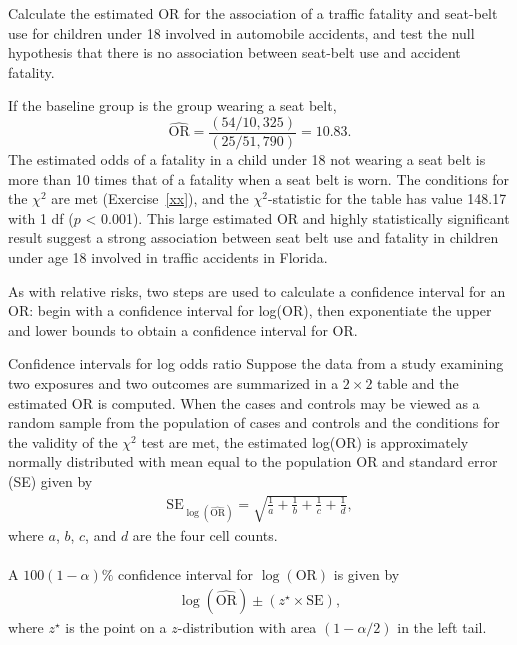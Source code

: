 
\begin{examplewrap}
  \begin{nexample}{Calculate the estimated OR for the association of a traffic fatality and seat-belt use for children under 18 involved in automobile accidents, and test the null hypothesis that there is no association between seat-belt use and accident fatality.} \label{seatbeltUseFatalityChildren}

    If the baseline group is the group wearing a seat belt,
 \[
      \widehat{\text{OR}} = \dfrac{(54/10,325)}{(25/51,790)} = 10.83.
 \]
 The estimated odds of a fatality in a child under 18 not wearing a seat belt is more than 10 times that of a fatality when a seat belt is worn.  The conditions for the $\chi^2$ are met (Exercise~\ref{xx}), and the $\chi^2$-statistic for the table has value 148.17 with 1 df ($p$ < 0.001).  This large estimated OR and highly statistically significant result suggest a strong association between seat belt use and fatality in children under age 18 involved in traffic accidents in Florida.
  \end{nexample}
\end{examplewrap}

As with relative risks, two steps are used to calculate a confidence interval for an OR: begin with a confidence interval for log(OR), then exponentiate the upper and lower bounds to obtain a confidence interval for OR.

\begin{onebox}{Confidence intervals for log odds ratio}
  Suppose the data from a study examining two exposures and two outcomes are summarized in a $2 \times 2$ table and the estimated OR is computed. When the cases and controls may be viewed as a random sample from the population of cases and controls and the conditions for the validity of the $\chi^2$ test are met, the estimated log(OR) is approximately normally distributed with mean equal to the population OR and standard error (SE) given by
  \begin{align*}
    \text{SE}_{\log(\widehat{\text{OR}})} = \sqrt{\frac{1}{a} + \frac{1}{b} 
   + \frac{1}{c} + \frac{1}{d}},
  \end{align*}
  where $a$, $b$, $c$, and $d$ are the four cell counts. \\
  \\
   A $100(1  - \alpha)\%$ confidence interval for $\log(\text{OR})$ is given by
\begin{align}
  \log(\widehat{\text{OR}}) \pm (z^{\star} \times \text{SE}),
  \label{eqn:confidenceIntervalOR}
\end{align}  
where $z^{\star}$ is the point on a $z$-distribution with area $(1 - \alpha/2)$ in the left tail.
\end{onebox}

